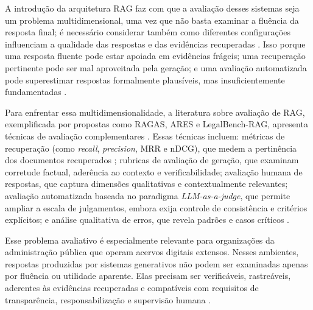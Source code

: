 A introdução da arquitetura RAG faz com que a avaliação desses sistemas seja um problema multidimensional, uma vez que não basta examinar a fluência da resposta final; é necessário considerar também como diferentes configurações influenciam a qualidade das respostas e das evidências recuperadas \parencite{liangEtAl2023helm,saadFalconEtAl2024ares,esEtAl2023ragas,pipitoneAlami2024legalbenchRag}. Isso porque uma resposta fluente pode estar apoiada em evidências frágeis; uma recuperação pertinente pode ser mal aproveitada pela geração; e uma avaliação automatizada pode superestimar respostas formalmente plausíveis, mas insuficientemente fundamentadas \parencite{liuEtAl2023geval,liuEtAl2025judgeRag}.

Para enfrentar essa multidimensionalidade, a literatura sobre avaliação de RAG, exemplificada por propostas como RAGAS, ARES e LegalBench-RAG, apresenta técnicas de avaliação complementares \parencite{esEtAl2023ragas,saadFalconEtAl2024ares,pipitoneAlami2024legalbenchRag}. Essas técnicas incluem: métricas de recuperação (como \textit{recall}, \textit{precision}, MRR e nDCG), que medem a pertinência dos documentos recuperados \parencite{manningEtAl2008informationRetrieval,thakurEtAl2021beir}; rubricas de avaliação de geração, que examinam corretude factual, aderência ao contexto e verificabilidade; avaliação humana de respostas, que captura dimensões qualitativas e contextualmente relevantes; avaliação automatizada baseada no paradigma \textit{LLM-as-a-judge}, que permite ampliar a escala de julgamentos, embora exija controle de consistência e critérios explícitos; e análise qualitativa de erros, que revela padrões e casos críticos \parencite{liuEtAl2023geval,liuEtAl2025judgeRag}.

Esse problema avaliativo é especialmente relevante para organizações da administração pública que operam acervos digitais extensos. Nesses ambientes, respostas produzidas por sistemas generativos não podem ser examinadas apenas por fluência ou utilidade aparente. Elas precisam ser verificáveis, rastreáveis, aderentes às evidências recuperadas e compatíveis com requisitos de transparência, responsabilização e supervisão humana \parencite{deAlmeidaSantos2025aiGovernance,wfd2023guidelinesAiParliaments,ipu2024aiParliaments}.

